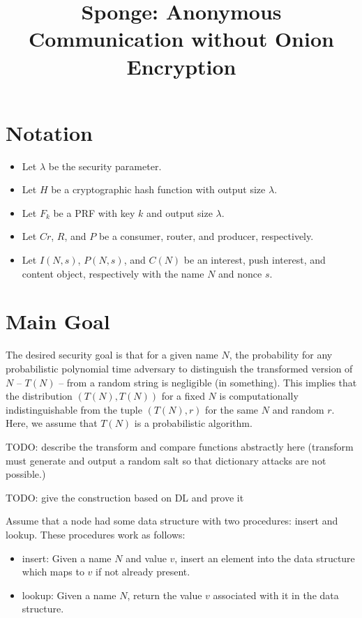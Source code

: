 \documentclass{article}
\begin{document}
\title{Sponge: Anonymous Communication without Onion Encryption}

\maketitle

\section{Notation}

\begin{itemize}
    \item Let $\lambda$ be the security parameter.
    \item Let $H$ be a cryptographic hash function with output size $\lambda$.
    \item Let $F_k$ be a PRF with key $k$ and output size $\lambda$. 
    \item Let $Cr$, $R$, and $P$ be a consumer, router, and producer, respectively.
    \item Let $I(N,s)$, $P(N,s)$, and $C(N)$ be an interest, push interest, and content object, respectively
    with the name $N$ and nonce $s$.
\end{itemize}

\section{Main Goal}
The desired security goal is that for a given name $N$, the probability for any
probabilistic polynomial time adversary to distinguish the transformed version
of $N$ -- $T(N)$ -- from a random string is negligible (in something). This implies that
the distribution $(T(N), T(N))$ for a fixed $N$ is computationally indistinguishable 
from the tuple $(T(N), r)$ for the same $N$ and random $r$. Here, we assume that $T(N)$
is a probabilistic algorithm. 

TODO: describe the transform and compare functions abstractly here (transform must generate
and output a random salt so that dictionary attacks are not possible.)

TODO: give the construction based on DL and prove it

Assume that a node had some data structure with two procedures: {\sf insert} and {\sf lookup}. 
These procedures work as follows:
%
\begin{itemize}
    \item {\sf insert}: Given a name $N$ and value $v$, insert an element into the data structure which maps to $v$ if not already present.
    \item {\sf lookup}: Given a name $N$, return the value $v$ associated with it in the data structure.
\end{itemize}
%
\end{document}
